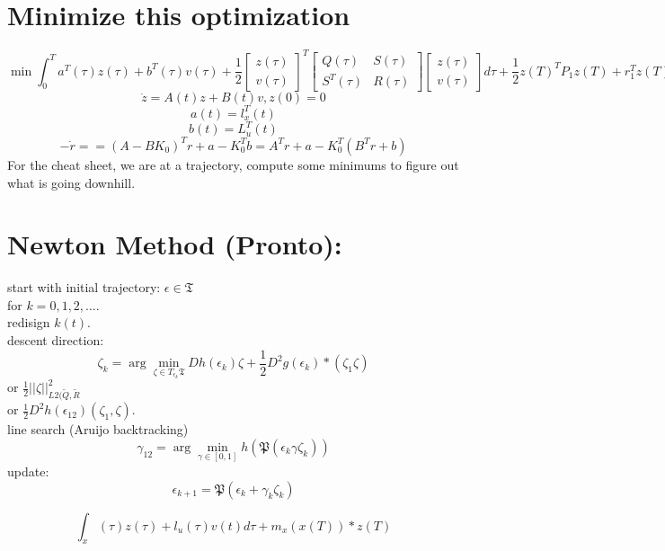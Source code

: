 \documentclass{article}
\begin{document}
\section{Minimize this optimization}
\[\min\int_0^Ta^T(\tau)z(\tau)+b^T(\tau)v(\tau)+\frac{1}{2}\begin{bmatrix}z(\tau)\\v(\tau)\end{bmatrix}^T\begin{bmatrix}Q(\tau) & S(\tau)\\S^T(\tau) & R(\tau)\end{bmatrix}\begin{bmatrix}z(\tau)\\v(\tau)\end{bmatrix}d\tau+\frac{1}{2}z(T)^TP_1z(T)+r_1^Tz(T)\]
\[\dot{z}=A(t)z+B(t)v, z(0)=0\]
\[a(t)=l_x^T(t)\]
\[b(t)=L_u^T(t)\]
\[-\dot{r}==(A-BK_0)^Tr+a-K_0^Tb=A^Tr+a-K_0^T(B^Tr+b)\]
For the cheat sheet, we are at a trajectory, compute some minimums to figure out what is going downhill.\\

\section{Newton Method (Pronto):}
start with initial trajectory: $\epsilon\in\mathfrak{T}$\\
for $k=0,1,2,\dots$.\\
redisign $k(t)$.\\
descent direction:\\
\[\zeta_k=\arg\min_{\zeta\in T_{\epsilon_k}\mathfrak{T}} Dh(\epsilon_k)\zeta+\frac{1}{2}D^2g(\epsilon_k)*(\zeta_1\zeta)\]
or $\frac{1}{2}\lvert\lvert \zeta\rvert\rvert^2_{L2(\tilde{Q},\tilde{R}}$\\
or $\frac{1}{2}D^2h(\epsilon_{12})(\zeta_1,\zeta)$.\\
line search (Aruijo backtracking)
\[\gamma_{12}=\arg\min_{\gamma\in[0,1]}h(\mathfrak{P}(\epsilon_k\gamma\zeta_k))\]
update:\\
\[\epsilon_{k+1}=\mathfrak{P}(\epsilon_k+\gamma_k\zeta_k)\]


\[\int_x(\tau)z(\tau)+l_u(\tau)v(t)d\tau+m_x(x(T))*z(T)\]
\end{document}
